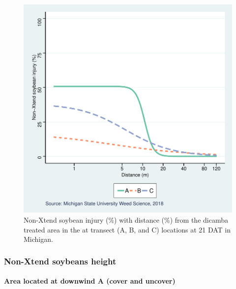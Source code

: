 \documentclass[]{article}
\let\oldparagraph\paragraph
\renewcommand{\paragraph}[1]{\oldparagraph{#1}\mbox{}}
\begin{document}
\begin{figure}
\centering
\includegraphics{Report_Dicamba_study_files/figure-latex/unnamed-chunk-56-1.pdf}
\caption{Non-Xtend soybean injury (\%) with distance (\%) from the
dicamba treated area in the at transect (A, B, and C) locations at 21
DAT in Michigan.}
\end{figure}

\newpgae
\pagebreak

\subsubsection{Non-Xtend soybeans
height}\label{non-xtend-soybeans-height-3}

\paragraph{Area located at downwind A (cover and
uncover)}\label{area-located-at-downwind-a-cover-and-uncover-1}
\end{document}
